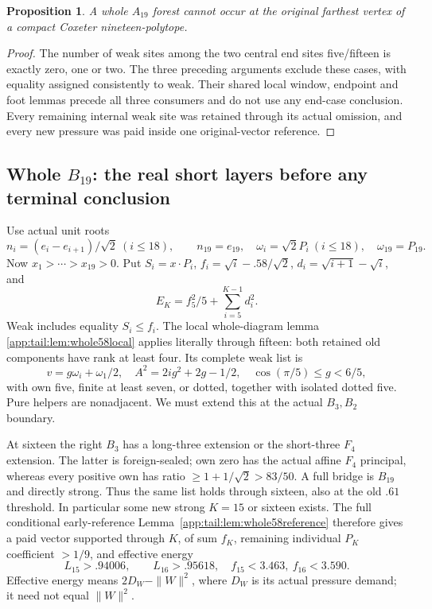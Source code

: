 \documentclass[11pt]{article}
\newtheorem{proposition}[theorem]{Proposition}
\theoremstyle{definition}
\theoremstyle{remark}
\begin{document}
\begin{proposition}\label{app:exact19:prop:wholeA19}
A whole \(A_{19}\) forest cannot occur
at the original farthest vertex of
a compact Coxeter nineteen-polytope.
\end{proposition}
\begin{proof}
The number of weak sites among the
two central end sites five/fifteen
is exactly zero, one or two.
The three preceding arguments
exclude these cases, with equality
assigned consistently to weak.
Their shared local window, endpoint
and foot lemmas precede all three
consumers and do not use any
end-case conclusion.
Every remaining internal weak
site was retained through its
actual omission, and every new
pressure was paid inside one
original-vector reference.
\end{proof}


\subsection{Whole \(B_{19}\): the real short layers before any terminal conclusion}
\label{app:exact19:Bwindow}

Use actual unit roots
\[
 n_i=(e_i-e_{i+1})/\sqrt2\ (i\le18),\qquad n_{19}=e_{19},
 \quad \omega_i=\sqrt2P_i\ (i\le18),\quad\omega_{19}=P_{19}.
\]
Now \(x_1>\cdots>x_{19}>0\).
Put \(S_i=x\cdot P_i\),
\(f_i=\sqrt i-.58/\sqrt2\),
\(d_i=\sqrt{i+1}-\sqrt i\), and
\[
                         E_K=f_5^2/5+\sum_{i=5}^{K-1}d_i^2 .
\]
Weak includes equality \(S_i\le f_i\).
The local whole-diagram lemma
\ref{app:tail:lem:whole58local} applies
literally through fifteen:
both retained old components have
rank at least four.
Its complete weak list is
\[
 v=g\omega_i+\omega_1/2,\quad
 A^2=2ig^2+2g-1/2,\quad
 \cos(\pi/5)\le g<6/5,
\tag{B19packet}\label{app:exact19:eq:Bpacket}
\]
with own five, finite at least seven,
or dotted, together with isolated
dotted five.
Pure helpers are nonadjacent.
We must extend this at the actual
\(B_3,B_2\) boundary.

At sixteen the right \(B_3\) has
a long-three extension or the
short-three \(F_4\) extension.
The latter is foreign-sealed;
own zero has the actual affine
\(F_4\) principal, whereas every
positive own has ratio
\(\ge1+1/\sqrt2>83/50\).
A full bridge is \(B_{19}\) and
directly strong.
Thus the same list holds through
sixteen, also at the old \(.61\)
threshold.
In particular some new strong
\(K=15\) or sixteen exists.
The full conditional early-reference
Lemma~\ref{app:tail:lem:whole58reference}
therefore gives a paid vector
supported through \(K\), of sum
\(f_K\), remaining individual
\(P_K\) coefficient \(>1/9\), and
effective energy
\[
               L_{15}>.94006,\qquad L_{16}>.95618,
               \quad f_{15}<3.463,\ f_{16}<3.590 .
\tag{B19early}\label{app:exact19:eq:Bearly}
\]
Effective energy means \(2D_W-\|W\|^2\),
where \(D_W\) is its actual pressure
demand; it need not equal \(\|W\|^2\).
\end{document}
